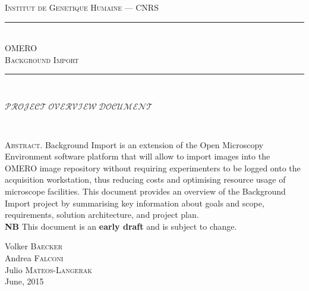 \documentclass{amsart}
\begin{document}
\begin{titlepage}
\begin{center}

\textsc{\small Institut de Genetique Humaine --- CNRS}\\[0.5cm]

\rule{114mm}{.1pt} \\[0.5cm]
\textsc{\LARGE OMERO \\[0.2cm] Background Import}  \\[0.5cm]
\rule{114mm}{.1pt} \\[0.5cm]

\begin{minipage}{114mm}
\begin{flushright} \large
$\mathcal{PROJECT~OVERVIEW~DOCUMENT}$
\end{flushright}
\end{minipage} \\[2cm]

\begin{minipage}{80mm}
\textsc{\large Abstract}.
Background Import is an extension of the Open Microscopy Environment software 
platform that will allow to import images into the OMERO image repository without 
requiring experimenters to be logged onto the acquisition workstation, thus reducing
costs and optimising resource usage of microscope facilities. 
This document provides an overview of the Background Import project by summarising 
key information about goals and scope, requirements, solution architecture, and 
project plan.
\\[0.5cm]
\textbf{NB} This document is an \textbf{early draft} and is subject to change.
\end{minipage}

\vfill
Volker \textsc{Baecker} \\
Andrea \textsc{Falconi} \\
Julio \textsc{Mateos-Langerak} \\[1cm]
{\large June, 2015}
\end{center}

\end{titlepage}












\end{document}
